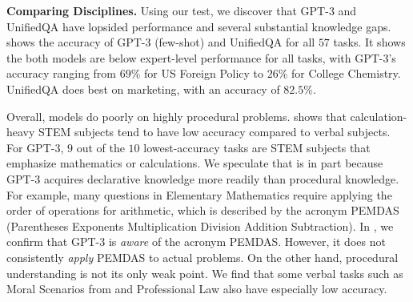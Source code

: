 




\noindent\textbf{Comparing Disciplines.}\quad
Using our test, we discover that GPT-3 and UnifiedQA have lopsided performance and several substantial knowledge gaps.  shows the accuracy of GPT-3 (few-shot) and UnifiedQA for all $57$ tasks. It shows the both models are below expert-level performance for all tasks, with GPT-3's accuracy ranging from $69\%$ for US Foreign Policy to $26\%$ for College Chemistry. UnifiedQA does best on marketing, with an accuracy of $82.5\%$.


Overall, models do poorly on highly procedural problems.
 shows that calculation-heavy STEM subjects tend to have low accuracy compared to verbal subjects.
For GPT-3, $9$ out of the $10$ lowest-accuracy tasks are STEM subjects that emphasize mathematics or calculations.
We speculate that is in part because GPT-3 acquires declarative knowledge more readily than procedural knowledge. For example, many questions in Elementary Mathematics require applying the order of operations for arithmetic, which is described by the acronym PEMDAS (Parentheses Exponents Multiplication Division Addition Subtraction). In , we confirm that GPT-3 is \emph{aware} of the acronym PEMDAS. However, it does not consistently \emph{apply} PEMDAS to actual problems. 
On the other hand, procedural understanding is not its only weak point. We find that some verbal tasks such as Moral Scenarios from \cite{hendrycks2020ethicsdataset} and Professional Law also have especially low accuracy.

